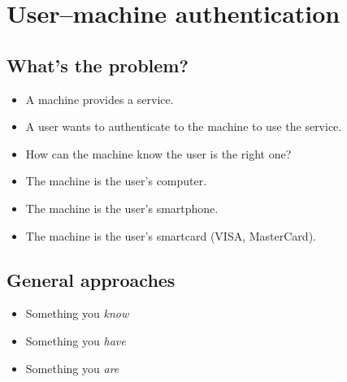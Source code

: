 \mode*




\section{User--machine authentication}

\subsection{What's the problem?}

\begin{frame}
  \begin{idea}
    \begin{itemize}
      \item A machine provides a service.
      \item A user wants to authenticate to the machine to use the service.
      \item How can the machine know the user is the right one?
    \end{itemize}
  \end{idea}

  \begin{example}
    \begin{itemize}
      \item The machine is the user's computer.
      \item The machine is the user's smartphone.
      \item The machine is the user's smartcard (\eg VISA, MasterCard).
    \end{itemize}
  \end{example}
\end{frame}

\subsection{General approaches}

\begin{frame}
  \begin{idea}
    \begin{itemize}
      \item Something you \emph{know}

        \pause

      \item Something you \emph{have}

        \pause

      \item Something you \emph{are}
    \end{itemize}
  \end{idea}
\end{frame}

